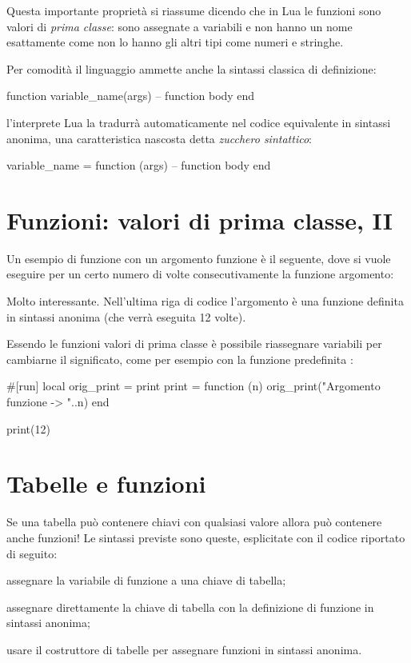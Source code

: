 Questa importante proprietà si riassume dicendo che in Lua le funzioni sono
valori di \emph{prima classe}: sono assegnate a variabili e non hanno un nome
esattamente come non lo hanno gli altri tipi come numeri e stringhe.

Per comodità il linguaggio ammette anche la sintassi classica di definizione:
\begin{lines}
function variable_name(args)
    -- function body
end
\end{lines}
l'interprete Lua la tradurrà automaticamente nel codice equivalente in sintassi
anonima, una caratteristica nascosta detta \emph{zucchero sintattico}:
\begin{lines}
variable_name = function (args)
    -- function body
end
\end{lines}


\section{Funzioni: valori di prima classe, II}

Un esempio di funzione con un argomento funzione è il seguente, dove si vuole
eseguire per un certo numero di volte consecutivamente la funzione argomento:

Molto interessante. Nell'ultima riga di codice l'argomento è una funzione
definita in sintassi anonima (che verrà eseguita 12 volte).

Essendo le funzioni valori di prima classe è possibile riassegnare variabili per
cambiarne il significato, come per esempio con la funzione predefinita
:
\begin{lines}
#[run]
local orig_print = print
print = function (n)
    orig_print("Argomento funzione -> "..n)
end

print(12)
\end{lines}


\section{Tabelle e funzioni}

Se una tabella può contenere chiavi con qualsiasi valore allora può contenere
anche funzioni! Le sintassi previste sono queste, esplicitate con il codice
riportato di seguito:
\begin{compactitemize}
\item assegnare la variabile di funzione a una chiave di tabella;
\item assegnare direttamente la chiave di tabella con la definizione di funzione
in sintassi anonima;
\item usare il costruttore di tabelle per assegnare funzioni in sintassi
anonima.
\end{compactitemize}


